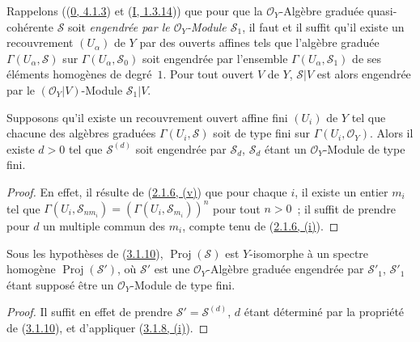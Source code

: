 \begin{env}[3.1.9]
\label{II.3.1.9-fr}
Rappelons ((\hyperref[0.4.1.3-fr]{0, 4.1.3}) et
(\hyperref[I.1.3.14-fr]{I, 1.3.14})) que pour que la
$\mathcal{O}_Y$-Algèbre graduée quasi-cohérente $\mathcal{S}$ soit
\emph{engendrée par le $\mathcal{O}_Y$-Module $\mathcal{S}_1$}, il faut et il
suffit qu'il existe un recouvrement $(U_\alpha)$ de $Y$ par des ouverts
affines tels que l'algèbre graduée $\Gamma(U_\alpha,\mathcal{S})$ sur
$\Gamma(U_\alpha,\mathcal{S}_0)$ soit engendrée par l'ensemble
$\Gamma(U_\alpha,\mathcal{S}_1)$ de ses éléments homogènes de degré~$1$. Pour
tout ouvert $V$ de $Y$, $\mathcal{S}|V$ est alors engendrée par le
$(\mathcal{O}_Y|V)$-Module $\mathcal{S}_1|V$.
\end{env}

\begin{proposition}[3.1.10]
\label{II.3.1.10-fr}
Supposons qu'il existe un recouvrement ouvert affine fini $(U_i)$ de $Y$ tel
que chacune des algèbres graduées $\Gamma(U_i,\mathcal{S})$ soit de type fini
sur $\Gamma(U_i,\mathcal{O}_Y)$. Alors il existe $d>0$ tel que
$\mathcal{S}^{(d)}$ soit engendrée par $\mathcal{S}_d$, $\mathcal{S}_d$ étant
un $\mathcal{O}_Y$-Module de type fini.
\end{proposition}

\begin{proof}
En effet, il résulte de (\hyperref[II.2.1.6-fr]{2.1.6, (v)}) que pour chaque
$i$, il existe un entier $m_i$ tel que
$\Gamma(U_i,\mathcal{S}_{nm_i})=(\Gamma(U_i,\mathcal{S}_{m_i}))^n$ pour tout
$n>0$~; il suffit de prendre pour $d$ un multiple commun des $m_i$, compte
tenu de (\hyperref[II.2.1.6-fr]{2.1.6, (i)}).
\end{proof}

\begin{corollary}[3.1.11]
\label{II.3.1.11-fr}
Sous les hypothèses de (\hyperref[II.3.1.10-fr]{3.1.10}),
$\operatorname{Proj}(\mathcal{S})$ est $Y$-isomorphe à un spectre homogène
$\operatorname{Proj}(\mathcal{S}')$, où $\mathcal{S}'$ est une
$\mathcal{O}_Y$-Algèbre graduée engendrée par $\mathcal{S}'_1$,
$\mathcal{S}'_1$ étant supposé être un $\mathcal{O}_Y$-Module de type fini.
\end{corollary}

\begin{proof}
Il suffit en effet de prendre $\mathcal{S}'=\mathcal{S}^{(d)}$, $d$ étant
déterminé par la propriété de (\hyperref[II.3.1.10-fr]{3.1.10}), et
d'appliquer (\hyperref[II.3.1.8-fr]{3.1.8, (i)}).
\end{proof}

